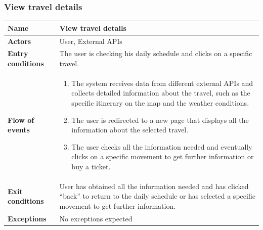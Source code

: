 \subsubsection{View travel details}
\begin{table}[!h]
	\centering
	{\renewcommand{\arraystretch}{2}%
		\begin{tabular}{|l|p{12cm}|}
			\hline
			\textbf{Name} 				& \textbf{View travel details} \\ \hline
			\textbf{Actors} 			& User, External APIs \\ \hline
			\textbf{Entry conditions} 	& The user is checking his daily schedule and clicks on a specific travel. \\ \hline
			\textbf{Flow of events}		& \begin{minipage}[t]{0.75\textwidth}
				\begin{enumerate}
					\item The system receives data from different external APIs and collects detailed information about the travel, such as the specific itinerary on the map and the weather conditions.
					\item The user is redirected to a new page that displays all the information about the selected travel.
					\item The user checks all the information needed and eventually clicks on a specific movement to get further information or buy a ticket.
				\end{enumerate}
			\end{minipage}	\\ \hline
			\textbf{Exit conditions}	& User has obtained all the information needed and has clicked “back” to return to the daily schedule or has selected a specific movement to get further information.  \\ \hline
			\textbf{Exceptions}			& No exceptions expected  \\ \hline
	\end{tabular}}
\end{table}


